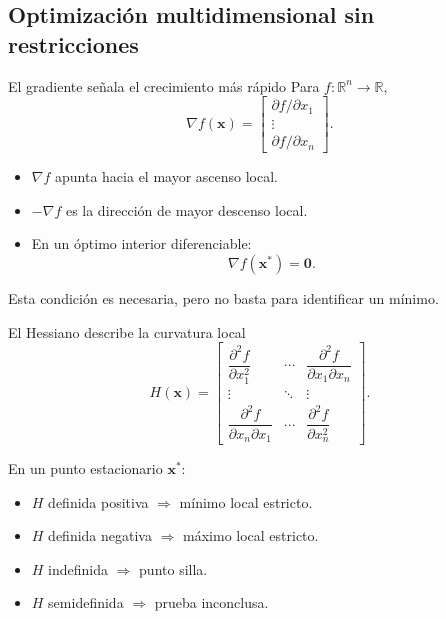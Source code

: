 \documentclass[../../main.tex]{subfiles}
\begin{document}

\subsection{Optimización multidimensional sin restricciones}

\begin{frame}{El gradiente señala el crecimiento más rápido}
Para $f:\mathbb{R}^n\rightarrow\mathbb{R}$,
\[
\nabla f(\mathbf{x})=
\begin{bmatrix}
\partial f/\partial x_1\\
\vdots\\
\partial f/\partial x_n
\end{bmatrix}.
\]

\begin{itemize}
  \item $\nabla f$ apunta hacia el mayor ascenso local.
  \item $-\nabla f$ es la dirección de mayor descenso local.
  \item En un óptimo interior diferenciable:
  \[
  \nabla f(\mathbf{x}^*)=\mathbf{0}.
  \]
\end{itemize}

Esta condición es necesaria, pero no basta para identificar un mínimo.
\end{frame}

\begin{frame}{El Hessiano describe la curvatura local}
\[
H(\mathbf{x})=
\begin{bmatrix}
\dfrac{\partial^2f}{\partial x_1^2} & \cdots & \dfrac{\partial^2f}{\partial x_1\partial x_n}\\
\vdots & \ddots & \vdots\\
\dfrac{\partial^2f}{\partial x_n\partial x_1} & \cdots & \dfrac{\partial^2f}{\partial x_n^2}
\end{bmatrix}.
\]

En un punto estacionario $\mathbf{x}^*$:
\begin{itemize}
  \item $H$ definida positiva $\Rightarrow$ mínimo local estricto.
  \item $H$ definida negativa $\Rightarrow$ máximo local estricto.
  \item $H$ indefinida $\Rightarrow$ punto silla.
  \item $H$ semidefinida $\Rightarrow$ prueba inconclusa.
\end{itemize}
\end{frame}
\end{document}

